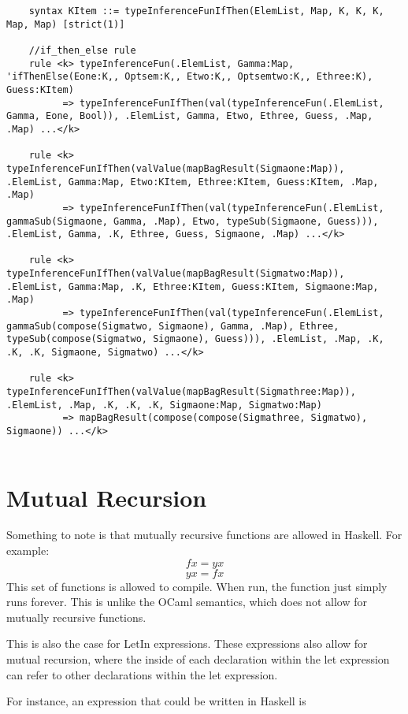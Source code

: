 \begin{lstlisting}
    syntax KItem ::= typeInferenceFunIfThen(ElemList, Map, K, K, K, Map, Map) [strict(1)]

    //if_then_else rule
    rule <k> typeInferenceFun(.ElemList, Gamma:Map, 'ifThenElse(Eone:K,, Optsem:K,, Etwo:K,, Optsemtwo:K,, Ethree:K), Guess:KItem)
          => typeInferenceFunIfThen(val(typeInferenceFun(.ElemList, Gamma, Eone, Bool)), .ElemList, Gamma, Etwo, Ethree, Guess, .Map, .Map) ...</k>

    rule <k> typeInferenceFunIfThen(valValue(mapBagResult(Sigmaone:Map)), .ElemList, Gamma:Map, Etwo:KItem, Ethree:KItem, Guess:KItem, .Map, .Map)
          => typeInferenceFunIfThen(val(typeInferenceFun(.ElemList, gammaSub(Sigmaone, Gamma, .Map), Etwo, typeSub(Sigmaone, Guess))), .ElemList, Gamma, .K, Ethree, Guess, Sigmaone, .Map) ...</k>

    rule <k> typeInferenceFunIfThen(valValue(mapBagResult(Sigmatwo:Map)), .ElemList, Gamma:Map, .K, Ethree:KItem, Guess:KItem, Sigmaone:Map, .Map)
          => typeInferenceFunIfThen(val(typeInferenceFun(.ElemList, gammaSub(compose(Sigmatwo, Sigmaone), Gamma, .Map), Ethree, typeSub(compose(Sigmatwo, Sigmaone), Guess))), .ElemList, .Map, .K, .K, .K, Sigmaone, Sigmatwo) ...</k>

    rule <k> typeInferenceFunIfThen(valValue(mapBagResult(Sigmathree:Map)), .ElemList, .Map, .K, .K, .K, Sigmaone:Map, Sigmatwo:Map)
          => mapBagResult(compose(compose(Sigmathree, Sigmatwo), Sigmaone)) ...</k>
          
\end{lstlisting}

\section{Mutual Recursion}
Something to note is that mutually recursive functions are allowed in Haskell.
For example:
$$
f x = y x
$$
$$
y x = f x
$$
This set of functions is allowed to compile. When run, the function just simply runs forever. This is unlike the OCaml semantics, which does not allow for mutually recursive functions.

This is also the case for LetIn expressions. These expressions also allow for mutual recursion, where the inside of each declaration within the let expression can refer to other declarations within the let expression.

For instance, an expression that could be written in Haskell is

